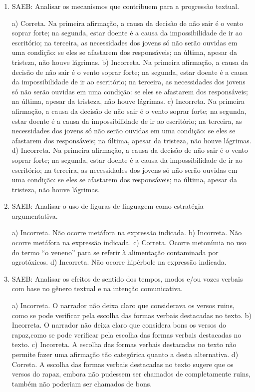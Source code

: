 \begin{enumerate}
	\item
SAEB: Analisar os mecanismos que contribuem para a progressão textual.

a) Correta. Na primeira afirmação, a causa da decisão de não sair é o vento soprar forte;
na segunda, estar doente é a causa da impossibilidade de ir ao escritório; na terceira, 
as necessidades dos jovens só não serão ouvidas em uma condição: se eles se afastarem dos
responsáveis; na última, apesar da tristeza, não houve lágrimas. 
b) Incorreta. Na primeira afirmação, a causa da decisão de não sair é o vento soprar forte;
na segunda, estar doente é a causa da impossibilidade de ir ao escritório; na terceira, 
as necessidades dos jovens só não serão ouvidas em uma condição: se eles se afastarem dos
responsáveis; na última, apesar da tristeza, não houve lágrimas.  
c) Incorreta. Na primeira afirmação, a causa da decisão de não sair é o vento soprar forte;
na segunda, estar doente é a causa da impossibilidade de ir ao escritório; na terceira, 
as necessidades dos jovens só não serão ouvidas em uma condição: se eles se afastarem dos
responsáveis; na última, apesar da tristeza, não houve lágrimas. 
d) Incorreta. Na primeira afirmação, a causa da decisão de não sair é o vento soprar forte;
na segunda, estar doente é a causa da impossibilidade de ir ao escritório; na terceira, 
as necessidades dos jovens só não serão ouvidas em uma condição: se eles se afastarem dos
responsáveis; na última, apesar da tristeza, não houve lágrimas.
	
	\item
SAEB: Analisar o uso de figuras de linguagem como estratégia argumentativa.

a) Incorreta. Não ocorre metáfora na expressão indicada.
b) Incorreta. Não ocorre metáfora na expressão indicada.
c) Correta. Ocorre metonímia no uso do termo ``o veneno'' para se
referir à alimentação contaminada por agrotóxicos. 
d) Incorreta. Não ocorre hipérbole na expressão indicada.

	\item
SAEB: Analisar os efeitos de sentido dos tempos, modos e/ou vozes verbais com
base no gênero textual e na intenção comunicativa.

a) Incorreta. O narrador não deixa claro que considerava os versos ruins, como se
pode verificar pela escolha das formas verbais destacadas no texto.
b) Incorreta. O narrador não deixa claro que considera bons os versos do rapaz,como se
pode verificar pela escolha das formas verbais destacadas no texto.
c) Incorreta. A escolha das formas verbais destacadas no texto não permite fazer uma
afirmação tão categórica quanto a desta alternativa.
d) Correta. A escolha das formas verbais destacadas no texto sugere que os versos do
rapaz, embora não pudessem ser chamados de completamente ruins, também não poderiam
ser chamados de bons.
	

\end{enumerate}
